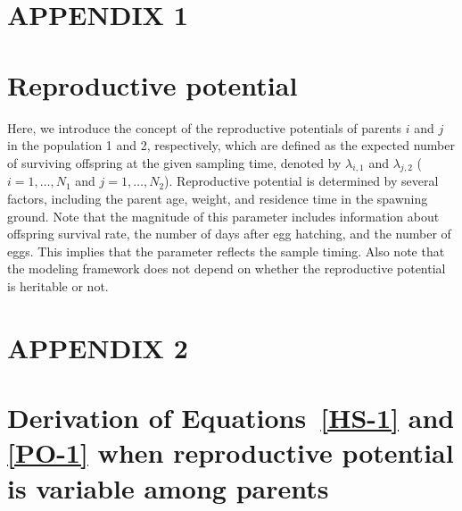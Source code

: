 \documentclass[12pt, English]{article}
\begin{document}
\begin{spacing}{1.9}
\clearpage

\section*{APPENDIX 1}
\setcounter{equation}{0}
\renewcommand{\theequation}{A\arabic{equation}}

\section*{Reproductive potential}

\renewcommand{\theequation}{A\arabic{equation}}
Here, we introduce the concept of the reproductive potentials of parents $i$ and $j$ in the population 1 and 2, respectively, which are defined as the expected number of surviving offspring at the given sampling time, denoted by $\lambda_{i,1}$ and $\lambda_{j,2}$ ($i=1, \ldots, N_1$ and $j=1, \ldots, N_2$). Reproductive potential is determined by several factors, including the parent age, weight, and residence time in the spawning ground. Note that the magnitude of this parameter includes information about offspring survival rate, the number of days after egg hatching, and the number of eggs. This implies that the parameter reflects the sample timing. Also note that the modeling framework does not depend on whether the reproductive potential is heritable or not.

\section*{APPENDIX 2}
\section*{Derivation of Equations~\ref{HS-1} and \ref{PO-1} when reproductive potential is variable among parents}


\end{spacing}
\end{document}
